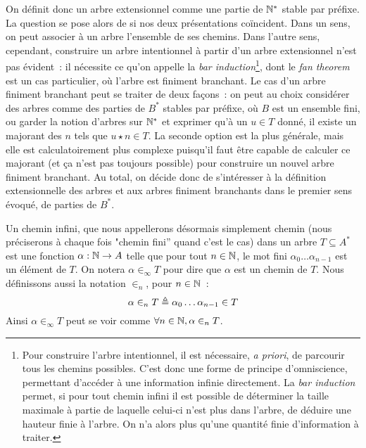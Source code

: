 \documentclass{article}
\begin{document}
On définit donc un arbre extensionnel comme une partie de $\mathbb{N}^*$ stable par préfixe. La question se pose alors de si nos deux présentations coïncident. Dans un sens, on peut associer à un arbre l'ensemble de ses chemins. Dans l'autre sens, cependant, construire un arbre intentionnel à partir d'un arbre extensionnel n'est pas évident~: il nécessite ce qu'on appelle la \textit{bar induction}\footnote{Pour construire l'arbre intentionnel, il est nécessaire, \textit{a priori}, de parcourir tous les chemins possibles. C'est donc une forme de principe d'omniscience, permettant d'accéder à une information infinie directement. La \textit{bar induction} permet, si pour tout chemin infini il est possible de déterminer la taille maximale à partie de laquelle celui-ci n'est plus dans l'arbre, de déduire une hauteur finie à l'arbre. On n'a alors plus qu'une quantité finie d'information à traiter.}, dont le \textit{fan theorem} est un cas particulier, où l'arbre est finiment branchant. Le cas d'un arbre finiment branchant peut se traiter de deux façons~: on peut au choix considérer des arbres comme des parties de $B^*$ stables par préfixe, où $B$ est un ensemble fini, ou garder la notion d'arbres sur $\mathbb{N}^*$ et exprimer qu'à un $u \in T$ donné, il existe un majorant des $n$ tels que $u \star n \in T$. La seconde option est la plus générale, mais elle est calculatoirement plus complexe puisqu'il faut être capable de calculer ce majorant (et ça n'est pas toujours possible) pour construire un nouvel arbre finiment branchant. Au total, on décide donc de s'intéresser à la définition extensionnelle des arbres et aux arbres finiment branchants dans le premier sens évoqué, de parties de $B^*$.

Un chemin infini, que nous appellerons désormais simplement chemin (nous préciserons à chaque fois "chemin fini'' quand c'est le cas) dans un arbre $T \subseteq A^*$ est une fonction $\alpha : \mathbb{N} \to A$ telle que pour tout $n\in \mathbb{N}$, le mot fini $\alpha_0\ldots\alpha_{n-1}$ est un élément de $T$. On notera $\alpha \in_\infty T$ pour dire que $\alpha$ est un chemin de $T$. Nous définissons aussi la notation $\in_n$, pour $n \in \mathbb{N}$~:
\[\alpha \in_n T \triangleq \alpha_0\ldots\alpha_{n-1} \in T\]
Ainsi $\alpha\in_\infty T$ peut se voir comme $\forall n\in \mathbb{N}, \alpha\in_n T$.
\end{document}
